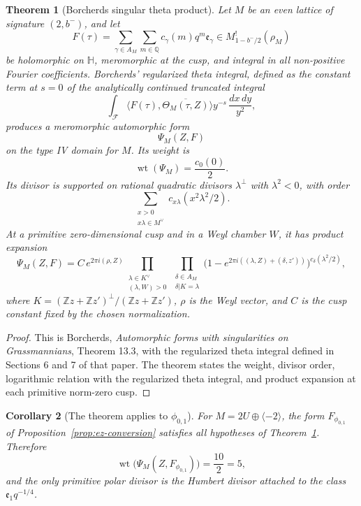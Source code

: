 \documentclass[11pt]{amsart}
\newtheorem{theorem}{Theorem}[section]
\newtheorem{corollary}[theorem]{Corollary}
\newcommand{\ZZ}{\mathbb{Z}}
\newcommand{\QQ}{\mathbb{Q}}
\newcommand{\HH}{\mathbb{H}}
\newcommand{\phij}{\phi_{0,1}}
\newcommand{\Weil}{\rho}
\newcommand{\wt}{\operatorname{wt}}
\begin{document}
\begin{theorem}[Borcherds singular theta product]
\label{thm:borcherds-product}
Let \(M\) be an even lattice of signature \((2,b^-)\), and let
\[
 F(\tau)=\sum_{\gamma\in A_M}\sum_{m\in\QQ}
 c_\gamma(m)q^m\mathfrak e_\gamma
 \in M^!_{1-b^-/2}(\Weil_M)
\]
be holomorphic on \(\HH\), meromorphic at the cusp, and integral in
all non-positive Fourier coefficients.  Borcherds' regularized theta
integral, defined as the constant term at \(s=0\) of the analytically
continued truncated integral
\[
 \int_{\mathcal F}
 \bigl\langle F(\tau),\overline{\Theta_M(\tau,Z)}\bigr\rangle
 y^{-s}\,\frac{dx\,dy}{y^2},
\]
produces a meromorphic automorphic form
\[
 \Psi_M(Z,F)
\]
on the type IV domain for \(M\).  Its weight is
\[
 \wt(\Psi_M)=\frac{c_0(0)}{2}.
\]
Its divisor is supported on rational quadratic divisors
\(\lambda^\perp\) with \(\lambda^2<0\), with order
\[
 \sum_{\substack{x>0\\x\lambda\in M^\vee}}
 c_{x\lambda}(x^2\lambda^2/2).
\]
At a primitive zero-dimensional cusp and in a Weyl chamber \(W\), it
has product expansion
\[
 \Psi_M(Z,F)
 =C\,e^{2\pi i(\rho,Z)}
 \prod_{\substack{\lambda\in K^\vee\\(\lambda,W)>0}}
 \prod_{\substack{\delta\in A_M\\\delta|K=\lambda}}
 \bigl(1-e^{2\pi i((\lambda,Z)+(\delta,z'))}\bigr)^{
 c_\delta(\lambda^2/2)},
\]
where \(K=(\ZZ z+\ZZ z')^\perp/(\ZZ z+\ZZ z')\), \(\rho\) is the
Weyl vector, and \(C\) is the cusp constant fixed by the chosen
normalization.
\end{theorem}

\begin{proof}
This is Borcherds, \emph{Automorphic forms with singularities on
Grassmannians}, Theorem 13.3, with the regularized theta integral
defined in Sections 6 and 7 of that paper.  The theorem states the
weight, divisor order, logarithmic relation with the regularized
theta integral, and product expansion at each primitive norm-zero
cusp.
\end{proof}

\begin{corollary}[The theorem applies to \(\phij\)]
\label{cor:borch-applies-phi01}
For \(M=2U\oplus\langle -2\rangle\), the form \(F_{\phij}\) of
Proposition~\ref{prop:ez-conversion} satisfies all hypotheses of
Theorem~\ref{thm:borcherds-product}.  Therefore
\[
 \wt\bigl(\Psi_M(Z,F_{\phij})\bigr)=\frac{10}{2}=5,
\]
and the only primitive polar divisor is the Humbert divisor attached
to the class \(\mathfrak e_1 q^{-1/4}\).
\end{corollary}
\end{document}
